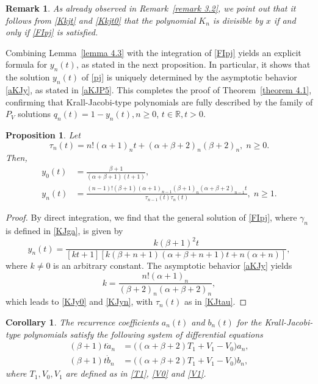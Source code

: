 \documentclass[10pt, reqno]{amsart}
\numberwithin{equation}{section}
\newtheorem{corollary}{Corollary}[section]
\newtheorem{proposition}{Proposition}[section]
\newtheorem{remark}{Remark}[section]
\numberwithin{equation}{section}
\begin{document}
\begin{remark} \label{remark 4.2}
\emph{As already observed in Remark~\ref{remark 3.2}, we point out that it follows from \eqref{Kkjt} and \eqref{Kkjt0} that the polynomial $K_n$ is divisible by $x$ if and only if \eqref{FIpj} is satisfied.}
\end{remark} 

Combining Lemma~\ref{lemma 4.3} with the integration of \eqref{FIpj} yields an explicit formula for $y_n(t)$, as stated in the next proposition. In particular, it shows that the solution $y_n(t)$ of \eqref{pj} is uniquely determined by the asymptotic behavior \eqref{aKJy}, as stated in \eqref{aKJP5}. This completes the proof of Theorem~\ref{theorem 4.1}, confirming that Krall-Jacobi-type polynomials are fully described by the family of $P_V$ solutions $q_n(t)=1-y_n(t), n\geq 0$, $t\in\mathbb{R}, t>0$.
\begin{proposition} \label{proposition 4.2}
Let
\begin{equation}
\tau_n(t)=n!(\alpha+1)_nt+(\alpha+\beta+2)_n(\beta+2)_n, \; n\geq 0. \label{KJtau}
\end{equation}
Then, 
\begin{align}
y_0(t)&=\frac{\beta+1}{(\alpha+\beta+1)(t+1)},\label{KJy0}\\
y_n(t)&=\frac{(n-1)!(\beta+1)(\alpha+1)_{n-1}(\beta+1)_n(\alpha+\beta+2)_{n-1}t}{\tau_{n-1}(t)\tau_{n}(t)}, \;n\geq 1.\label{KJyn}
\end{align}
\end{proposition}
\begin{proof}
By direct integration, we find that the general solution of \eqref{FIpj}, where $\gamma_n$ is defined in \eqref{KJga}, is given by
\begin{equation*}
y_n(t)=\frac{k(\beta+1)^2 t}{[kt+1][k(\beta+n+1)(\alpha+\beta+n+1)t+n(\alpha+n)]},
\end{equation*}
where $k\neq 0$ is an arbitrary constant. The asymptotic behavior \eqref{aKJy} yields
\begin{equation*}
k=\frac{n!(\alpha+1)_n}{(\beta+2)_n(\alpha+\beta+2)_n},
\end{equation*}
which leads to \eqref{KJy0} and \eqref{KJyn}, with $\tau_n(t)$ as in \eqref{KJtau}.
\end{proof}
\begin{corollary} \label{corollary 4.1}
The recurrence coefficients $a_n(t)$ and $b_n(t)$ for the Krall-Jacobi-type polynomials satisfy the following system of differential equations
\begin{align}
(\beta+1)t\dot{a}_n&=\big((\alpha+\beta+2)T_1+V_1-V_0\big)a_n,\label{KJTVa}\\
(\beta+1)t\dot{b}_n&=\big((\alpha+\beta+2)T_1+V_1-V_0\big)b_n\label{KJTVb},
\end{align}
where $T_1, V_0, V_1$ are defined as in \eqref{T1}, \eqref{V0} and \eqref{V1}.
\end{corollary}
\end{document}
